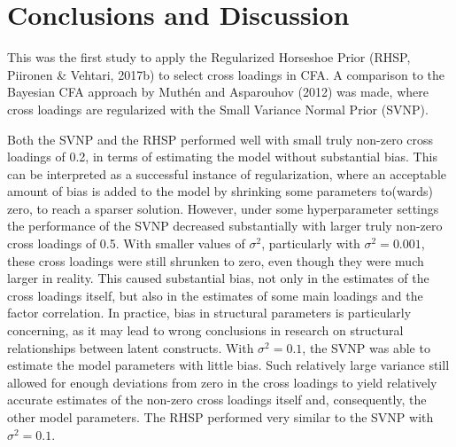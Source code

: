 \documentclass[
  man, donotrepeattitle,floatsintext]{apa6}
\begin{document}
\hypertarget{conclusions-and-discussion}{%
\section{Conclusions and Discussion}\label{conclusions-and-discussion}}

This was the first study to apply the Regularized Horseshoe Prior (RHSP, Piironen \& Vehtari, 2017b) to select cross loadings in CFA. A comparison
to the Bayesian CFA approach by Muthén and Asparouhov (2012) was made, where
cross loadings are regularized with the Small Variance Normal Prior
(SVNP).

Both the SVNP and the RHSP performed well with small truly non-zero
cross loadings of 0.2, in terms of estimating the model without
substantial bias. This can be interpreted as a successful instance of
regularization, where an acceptable amount of bias is added to the model
by shrinking some parameters to(wards) zero, to reach a sparser
solution. However, under some hyperparameter settings the performance of
the SVNP decreased substantially with larger truly non-zero cross
loadings of 0.5. With smaller values of \(\sigma^2\), particularly with
\(\sigma^2 = 0.001\), these cross loadings were still shrunken to zero,
even though they were much larger in reality. This caused substantial
bias, not only in the estimates of the cross loadings itself, but also
in the estimates of some main loadings and the factor correlation. In
practice, bias in structural parameters is particularly concerning, as
it may lead to wrong conclusions in research on structural relationships
between latent constructs. With \(\sigma^2 = 0.1\), the SVNP was able to
estimate the model parameters with little bias. Such relatively large
variance still allowed for enough deviations from zero in the cross
loadings to yield relatively accurate estimates of the non-zero cross
loadings itself and, consequently, the other model parameters. The RHSP
performed very similar to the SVNP with \(\sigma^2 = 0.1\).
\end{document}
